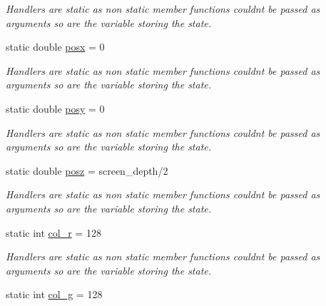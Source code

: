 \begin{DoxyCompactItemize}
\begin{DoxyCompactList}\small\item\em Handlers are static as non static member functions couldn\textquotesingle{}t be passed as arguments so are the variable storing the state. \end{DoxyCompactList}\item 
static double \hyperlink{classcft_1_1Crafter_a5c2adcdf34e2dd99cefc0ae9d8ad6af0}{posx} = 0\hypertarget{classcft_1_1Crafter_a5c2adcdf34e2dd99cefc0ae9d8ad6af0}{}\label{classcft_1_1Crafter_a5c2adcdf34e2dd99cefc0ae9d8ad6af0}

\begin{DoxyCompactList}\small\item\em Handlers are static as non static member functions couldn\textquotesingle{}t be passed as arguments so are the variable storing the state. \end{DoxyCompactList}\item 
static double \hyperlink{classcft_1_1Crafter_a1ddfd1c078cfee931cdf01f66bfee489}{posy} = 0\hypertarget{classcft_1_1Crafter_a1ddfd1c078cfee931cdf01f66bfee489}{}\label{classcft_1_1Crafter_a1ddfd1c078cfee931cdf01f66bfee489}

\begin{DoxyCompactList}\small\item\em Handlers are static as non static member functions couldn\textquotesingle{}t be passed as arguments so are the variable storing the state. \end{DoxyCompactList}\item 
static double \hyperlink{classcft_1_1Crafter_a18a6178af00edeb349988756322db7a4}{posz} = screen\+\_\+depth/2\hypertarget{classcft_1_1Crafter_a18a6178af00edeb349988756322db7a4}{}\label{classcft_1_1Crafter_a18a6178af00edeb349988756322db7a4}

\begin{DoxyCompactList}\small\item\em Handlers are static as non static member functions couldn\textquotesingle{}t be passed as arguments so are the variable storing the state. \end{DoxyCompactList}\item 
static int \hyperlink{classcft_1_1Crafter_a6d2febc7e21fc2c197a4d7d0b3558d96}{col\+\_\+r} = 128\hypertarget{classcft_1_1Crafter_a6d2febc7e21fc2c197a4d7d0b3558d96}{}\label{classcft_1_1Crafter_a6d2febc7e21fc2c197a4d7d0b3558d96}

\begin{DoxyCompactList}\small\item\em Handlers are static as non static member functions couldn\textquotesingle{}t be passed as arguments so are the variable storing the state. \end{DoxyCompactList}\item 
static int \hyperlink{classcft_1_1Crafter_af2635f8b801c0fc7b51445da759c4523}{col\+\_\+g} = 128\hypertarget{classcft_1_1Crafter_af2635f8b801c0fc7b51445da759c4523}{}\label{classcft_1_1Crafter_af2635f8b801c0fc7b51445da759c4523}


\end{DoxyCompactItemize}

